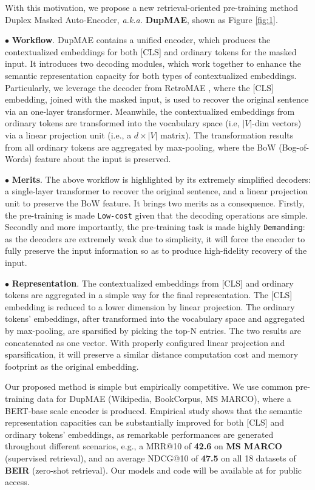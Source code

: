 \documentclass[11pt,a4paper]{article}
\begin{document}
With this motivation, we propose a new retrieval-oriented pre-training method Duplex Masked Auto-Encoder, \textit{a.k.a.} \textbf{DupMAE}, shown as Figure \ref{fig:1}.  

$\bullet$ \textbf{Workflow}. DupMAE contains a unified encoder, which produces the contextualized embeddings for both [CLS] and ordinary tokens for the masked input. It introduces two decoding modules, which work together to enhance the semantic representation capacity for both types of contextualized embeddings. Particularly, we leverage the decoder from RetroMAE \cite{liu2022retromae}, where the [CLS] embedding, joined with the masked input, is used to recover the original sentence via an one-layer transformer. Meanwhile, the contextualized embeddings from ordinary tokens are transformed into the vocabulary space (i.e, $|V|$-dim vectors) via a linear projection unit (i.e., a $d \times |V|$ matrix). The transformation results from all ordinary tokens are aggregated by max-pooling, where the BoW (Bog-of-Words) feature about the input is preserved.  

$\bullet$ \textbf{Merits}. The above workflow is highlighted by its {extremely} {simplified} decoders: a single-layer transformer to recover the original sentence, and a linear projection unit to preserve the BoW feature. It brings two merits as a consequence. Firstly, the pre-training is made \texttt{Low-cost} given that the decoding operations are simple. Secondly and more importantly, the pre-training task is made highly \texttt{Demanding}: as the decoders are extremely weak due to simplicity, it will force the encoder to fully preserve the input information so as to produce high-fidelity recovery of the input. 



$\bullet$ \textbf{Representation}. The contextualized embeddings from [CLS] and ordinary tokens are aggregated in a simple way for the final representation. The [CLS] embedding is reduced to a lower dimension by linear projection. The ordinary tokens' embeddings, after transformed into the vocabulary space and aggregated by max-pooling, are sparsified by picking the top-N entries. The two results are concatenated as one vector. With properly configured linear projection and sparsification, it will preserve a similar distance computation cost and memory footprint as the original embedding.  

Our proposed method is simple but empirically competitive. We use common pre-training data for DupMAE (Wikipedia, BookCorpus, MS MARCO), where a BERT-base scale encoder is produced. 
Empirical study shows that the semantic representation capacities can be substantially improved for both [CLS] and ordinary tokens' embeddings, as remarkable performances are generated throughout different scenarios, e.g., a MRR@10 of \textbf{42.6} on \textbf{MS MARCO} (supervised retrieval), and an average NDCG@10 of \textbf{47.5} on all 18 datasets of \textbf{BEIR} (zero-shot retrieval). Our models and code will be available at \cite{retromae-code} for public access.  
\end{document}
